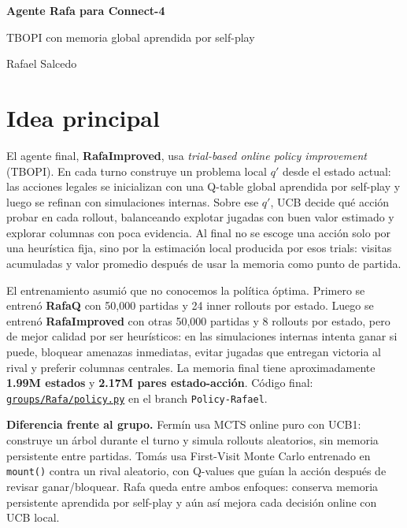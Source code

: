 \documentclass[10pt,letterpaper]{article}
\begin{document}
\begin{center}
\vspace*{-0.15cm}
{\fontsize{15}{18}\selectfont\bfseries Agente Rafa para Connect-4\par}
\vspace{2pt}
{\fontsize{10.5}{13}\selectfont TBOPI con memoria global aprendida por self-play\par}
\vspace{1pt}
{\fontsize{9}{11}\selectfont Rafael Salcedo\par}
\end{center}
\vspace{0.08cm}
\small

\section*{Idea principal}
El agente final, \textbf{RafaImproved}, usa \textit{trial-based online policy improvement} (TBOPI). En cada turno construye un problema local \(q'\) desde el estado actual: las acciones legales se inicializan con una Q-table global aprendida por self-play y luego se refinan con simulaciones internas. Sobre ese \(q'\), UCB decide qué acción probar en cada rollout, balanceando explotar jugadas con buen valor estimado y explorar columnas con poca evidencia. Al final no se escoge una acción solo por una heurística fija, sino por la estimación local producida por esos trials: visitas acumuladas y valor promedio después de usar la memoria como punto de partida.

El entrenamiento asumió que no conocemos la política óptima. Primero se entrenó \textbf{RafaQ} con 50,000 partidas y 24 inner rollouts por estado. Luego se entrenó \textbf{RafaImproved} con otras 50,000 partidas y 8 rollouts por estado, pero de mejor calidad por ser heurísticos: en las simulaciones internas intenta ganar si puede, bloquear amenazas inmediatas, evitar jugadas que entregan victoria al rival y preferir columnas centrales. La memoria final tiene aproximadamente \textbf{1.99M estados} y \textbf{2.17M pares estado-acción}. Código final: \href{https://github.com/rafaelsava/Connect4RL/blob/Policy-Rafael/groups/Rafa/policy.py}{\texttt{groups/Rafa/policy.py}} en el branch \texttt{Policy-Rafael}.

\textbf{Diferencia frente al grupo.} Fermín usa MCTS online puro con UCB1: construye un árbol durante el turno y simula rollouts aleatorios, sin memoria persistente entre partidas. Tomás usa First-Visit Monte Carlo entrenado en \texttt{mount()} contra un rival aleatorio, con Q-values que guían la acción después de revisar ganar/bloquear. Rafa queda entre ambos enfoques: conserva memoria persistente aprendida por self-play y aún así mejora cada decisión online con UCB local.
\end{document}
